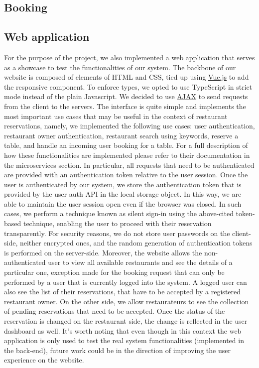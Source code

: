 \subsection{Booking}


\subsection{Web application}
For the purpose of the project, we also implemented a web application that serves as a showcase to test the functionalities of our system. The backbone of our website is composed of elements of HTML and CSS, tied up using \href{https://vuejs.org/}{Vue.js} to add the responsive component. To enforce types, we opted to use TypeScript in strict mode instead of the plain Javascript. We decided to use \href{https://en.wikipedia.org/wiki/Ajax_(programming)}{AJAX} to send requests from the client to the servers. The interface is quite simple and implements the most important use cases that may be useful in the context of restaurant reservations, namely, we implemented the following use cases: user authentication, restaurant owner authentication, restaurant search using keywords, reserve a table, and handle an incoming user booking for a table. For a full description of how these functionalities are implemented please refer to their documentation in the microservices section. In particular, all requests that need to be authenticated are provided with an authentication token relative to the user session. Once the user is authenticated by our system, we store the authentication token that is provided by the user auth API in the local storage object. In this way, we are able to maintain the user session open even if the browser was closed. In such cases, we perform a technique known as silent sign-in using the above-cited token-based technique, enabling the user to proceed with their reservation transparently. For security reasons, we do not store user passwords on the client-side, neither encrypted ones, and the random generation of authentication tokens is performed on the server-side. Moreover, the website allows the non-authenticated user to view all available restaurants and see the details of a particular one, exception made for the booking request that can only be performed by a user that is currently logged into the system. A logged user can also see the list of their reservations, that have to be accepted by a registered restaurant owner. On the other side, we allow restaurateurs to see the collection of pending reservations that need to be accepted. Once the status of the reservation is changed on the restaurant side, the change is reflected in the user dashboard as well. It's worth noting that even though in this context the web application is only used to test the real system functionalities (implemented in the back-end), future work could be in the direction of improving the user experience on the website.
